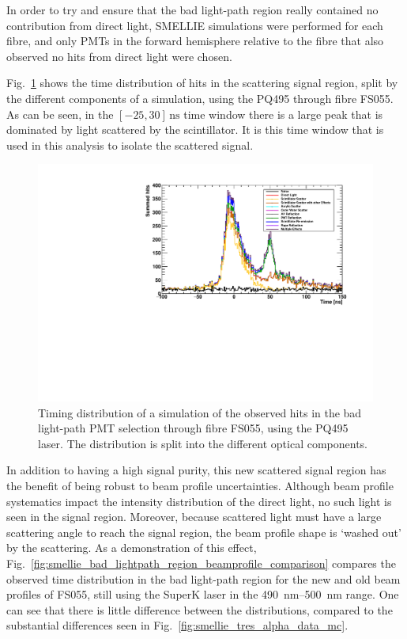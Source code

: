 In order to try and ensure that the bad light-path region really contained no contribution from direct light, SMELLIE simulations were performed for each fibre, and only PMTs in the forward hemisphere relative to the fibre that also observed no hits from direct light were chosen. %

Fig.~\ref{fig:smellie_bad_lightpath_region_tracked} shows the time distribution of hits in the scattering signal region, split by the different components of a simulation, using the PQ495 through fibre FS055. As can be seen, in the $[-25,30]\,\si{\ns}$ time window there is a large peak that is dominated by light scattered by the scintillator. It is this time window that is used in this analysis to isolate the scattered signal. 

\begin{figure}
    \centering
    \includegraphics[width=\textwidth]{5_SMELLIEAnalysis/images/bad_lightpaths_components_plot_FS055_PQ495_Jul2022.pdf}
    \caption[Timing distribution of a simulation of the observed hits in the bad light-path PMT selection, split by optical components]
    {Timing distribution of a simulation of the observed hits in the bad light-path PMT selection through fibre FS055, using the PQ495 laser. The distribution is split into the different optical components.}
    \label{fig:smellie_bad_lightpath_region_tracked}
\end{figure}

In addition to having a high signal purity, this new scattered signal region has the benefit of being robust to beam profile uncertainties. Although beam profile systematics impact the intensity distribution of the direct light, no such light is seen in the signal region. Moreover, because scattered light must have a large scattering angle to reach the signal region, the beam profile shape is `washed out' by the scattering. As a demonstration of this effect, Fig.~\ref{fig:smellie_bad_lightpath_region_beamprofile_comparison} compares the observed time distribution in the bad light-path region for the new and old beam profiles of FS055, still using the SuperK laser in the \SIrange{490}{500}{\nm} range. One can see that there is little difference between the distributions, compared to the substantial differences seen in Fig.~\ref{fig:smellie_tres_alpha_data_mc}.

